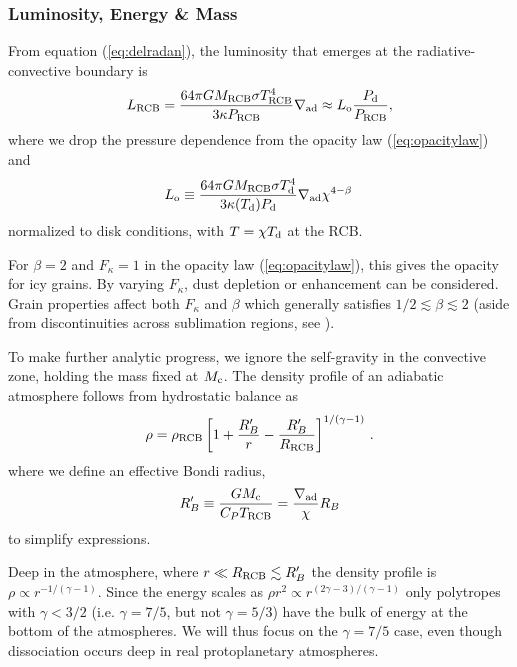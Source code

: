 \documentclass[apj]{emulateapj}
\newcommand{\delad}{\nabla_{\rm ad}}
\newcommand{\co}{_{\rm c}}
\newcommand{\di}{_{\rm o}}
\newcommand{\cb}{_{\rm RCB}}
\begin{document}
\subsubsection{Luminosity,  Energy \& Mass}
From equation (\ref{eq:delradan}), the luminosity that emerges at the radiative-convective boundary is
\begin{equation} \label{eq:Lcb}
L\cb = {64 \pi G M\cb \sigma T\cb^4 \over 3 \kappa P\cb } \nabla_{\rm ad} \approx L\di {P_{\rm d} \over P\cb}, %
\end{equation} 
where we drop the pressure dependence from the opacity law (\ref{eq:opacitylaw}) and
\begin{equation} 
L\di \equiv {64 \pi G M\cb \sigma T_{\rm d}^4 \over 3 \kappa(T_{\rm d}) P_{\rm d}} \nabla_{\rm ad}\chi^{4-\beta}\, 
\end{equation} 
normalized to disk conditions, with $T = \chi T_{\rm d}$ at the RCB.

 For $\beta = 2$ and $F_\kappa = 1$ in the opacity law (\ref{eq:opacitylaw}), this gives the \citet{bell94} opacity for icy grains.  By varying $F_\kappa$, dust depletion or enhancement can be considered.  Grain properties affect both $F_\kappa$ and $\beta$ which generally satisfies  $1/2 \lesssim \beta \lesssim 2$ (aside from discontinuities across sublimation regions, see \citet{semenov03}).

To make further analytic progress, we ignore the self-gravity in the convective zone, holding the mass fixed at $M\co$.  The density profile of an adiabatic atmosphere follows from hydrostatic balance as 
\begin{equation}\label{eq:rhoconv} 
\rho = \rho\cb \left[ 1 + {R_B' \over r} - {R_B' \over R\cb}  \right]^{1/(\gamma -1)}\, .
\end{equation} 
where we define an effective Bondi radius,
\begin{equation}
R_B' \equiv {G M\co \over C_P T\cb} = {\delad \over \chi} R_B
\end{equation} 
to simplify expressions.

  Deep in the atmosphere, where $r \ll R\cb \lesssim R_B'$ the density profile is $\rho \propto r^{-1/(\gamma -1)}$.  Since the energy scales as $\rho r^2 \propto r^{(2\gamma -3)/(\gamma - 1)}$ only polytropes with $\gamma < 3/2$ (i.e. $\gamma = 7/5$, but not $\gamma = 5/3$) have the bulk of energy at the bottom of the atmospheres.  We will thus focus on the $\gamma = 7/5$ case, even though dissociation occurs deep in real protoplanetary atmospheres.
\end{document}
